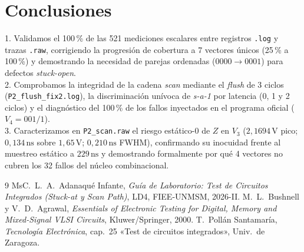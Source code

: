 \documentclass[10pt,twocolumn]{article}
\begin{document}
\section{Conclusiones}
1. Validamos el 100\,\% de las 521 mediciones escalares entre registros \texttt{.log} y trazas \texttt{.raw}, corrigiendo la progresión de cobertura a 7 vectores únicos (25\,\% a 100\,\%) y demostrando la necesidad de parejas ordenadas ($0000\to 0001$) para defectos \emph{stuck-open}.\\
2. Comprobamos la integridad de la cadena \emph{scan} mediante el \emph{flush} de 3 ciclos (\texttt{P2\_flush\_fix2.log}), la discriminación unívoca de \emph{s-a-1} por latencia (0, 1 y 2 ciclos) y el diagnóstico del 100\,\% de los fallos inyectados en el programa oficial ($V_4=001/1$).\\
3. Caracterizamos en \texttt{P2\_scan.raw} el riesgo estático-0 de $Z$ en $V_3$ ($2{,}1694\,\mathrm{V}$ pico; $0{,}134\,\mathrm{ns}$ sobre $1{,}65\,\mathrm{V}$; $0{,}210\,\mathrm{ns}$ FWHM), confirmando su inocuidad frente al muestreo estático a $229\,\mathrm{ns}$ y demostrando formalmente por qué 4 vectores no cubren los 32 fallos del núcleo combinacional.

\begin{thebibliography}{9}\footnotesize
{} MsC.\ L.\ A.\ Adanaqué Infante, \emph{Guía de Laboratorio: Test de Circuitos Integrados (Stuck-at y Scan Path)}, LD4, FIEE-UNMSM, 2026-II.
 M.\ L.\ Bushnell y V.\ D.\ Agrawal, \emph{Essentials of Electronic Testing for Digital, Memory and Mixed-Signal VLSI Circuits}, Kluwer/Springer, 2000.
 T.\ Pollán Santamaría, \emph{Tecnología Electrónica}, cap.\ 25 «Test de circuitos integrados», Univ.\ de Zaragoza.
\end{thebibliography}
\end{document}
